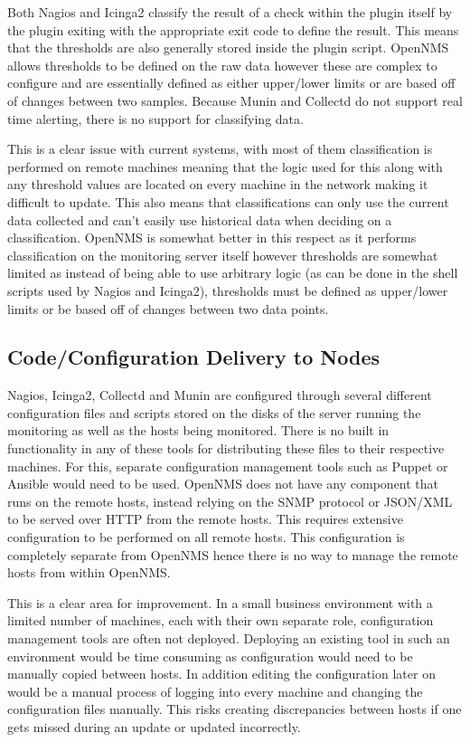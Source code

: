 \documentclass[bsc,deptreport,twoside,parskip,singlespacing,notimes]{infthesis}
\begin{document}
	Both Nagios and Icinga2 classify the result of a check within the plugin itself
	by the plugin exiting with the appropriate exit code to define the result. This
	means that the thresholds are also generally stored inside the plugin script.
	OpenNMS allows thresholds to be defined on the raw data however these are
	complex to configure and are essentially defined as either upper/lower limits
	or are based off of changes between two samples. Because Munin and Collectd do
	not support real time alerting, there is no support for classifying data.


	This is a clear issue with current systems, with most of them classification is
	performed on remote machines meaning that the logic used for this along with
	any threshold values are located on every machine in the network making it
	difficult to update. This also means that classifications can only use the
	current data collected and can't easily use historical data when deciding on a
	classification.  OpenNMS is somewhat better in this respect as it performs
	classification on the monitoring server itself however thresholds are somewhat
	limited as instead of being able to use arbitrary logic (as can be done in
	the shell scripts used by Nagios and Icinga2), thresholds must be defined as
	upper/lower limits or be based off of changes between two data points.

\subsection{Code/Configuration Delivery to Nodes}

	Nagios, Icinga2, Collectd and Munin are configured through several different
	configuration files and scripts stored on the disks of the server running the
	monitoring as well as the hosts being monitored.  There is no built in
	functionality in any of these tools for distributing these files to their
	respective machines.  For this, separate configuration management tools such as
	Puppet or Ansible would need to be used.  OpenNMS does not have any component
	that runs on the remote hosts, instead relying on the SNMP protocol or JSON/XML
	to be served over HTTP from the remote hosts.  This requires extensive
	configuration to be performed on all remote hosts.  This configuration is
	completely separate from OpenNMS hence there is no way to manage the remote
	hosts from within OpenNMS.


	This is a clear area for improvement. In a small business environment with a
	limited number of machines, each with their own separate role, configuration
	management tools are often not deployed.  Deploying an existing tool
	in such an environment would be time consuming as configuration would need
	to be manually copied between hosts. In addition editing the configuration later on
	would be a manual process of logging into every machine and changing the
	configuration files manually. This risks creating discrepancies between
	hosts if one gets missed during an update or updated incorrectly.
\end{document}
